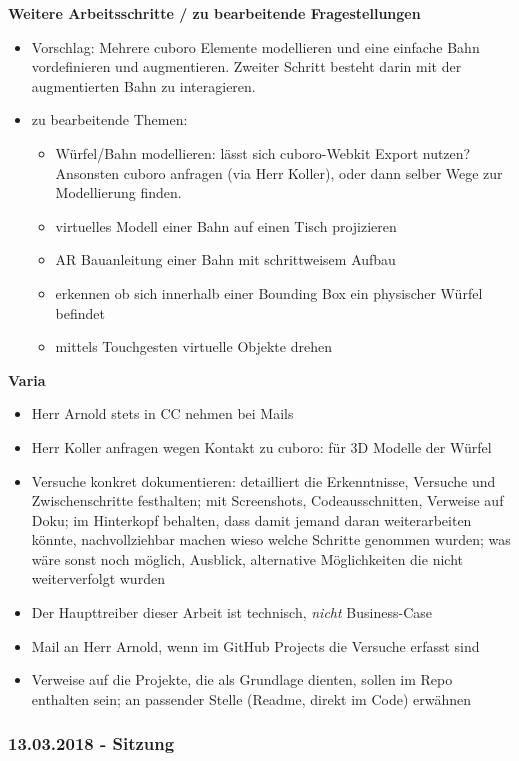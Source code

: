 \textbf{Weitere Arbeitsschritte / zu bearbeitende Fragestellungen}
\begin{itemize}
	\item Vorschlag: Mehrere cuboro Elemente modellieren und eine einfache Bahn vordefinieren und augmentieren. Zweiter Schritt besteht darin mit der augmentierten Bahn zu interagieren.
	\item zu bearbeitende Themen:
	\begin{itemize}
		\item Würfel/Bahn modellieren: lässt sich cuboro-Webkit Export nutzen? Ansonsten cuboro anfragen (via Herr Koller), oder dann selber Wege zur Modellierung finden.
		\item virtuelles Modell einer Bahn auf einen Tisch projizieren
		\item AR Bauanleitung einer Bahn mit schrittweisem Aufbau
		\item erkennen ob sich innerhalb einer Bounding Box ein physischer Würfel befindet
		\item mittels Touchgesten virtuelle Objekte drehen
	\end{itemize}
\end{itemize}

\textbf{Varia}
\begin{itemize}
	\item Herr Arnold stets in CC nehmen bei Mails
	\item Herr Koller anfragen wegen Kontakt zu cuboro: für 3D Modelle der Würfel
	\item Versuche konkret dokumentieren: detailliert die Erkenntnisse, Versuche und Zwischenschritte festhalten; mit Screenshots, Codeausschnitten, Verweise auf Doku; im Hinterkopf behalten, dass damit jemand daran weiterarbeiten könnte, nachvollziehbar machen wieso welche Schritte genommen wurden; was wäre sonst noch möglich, Ausblick, alternative Möglichkeiten die nicht weiterverfolgt wurden
	\item Der Haupttreiber dieser Arbeit ist technisch, \textit{nicht} Business-Case
	\item Mail an Herr Arnold, wenn im GitHub Projects die Versuche erfasst sind
	\item Verweise auf die Projekte, die als Grundlage dienten, sollen im Repo enthalten sein; an passender Stelle (Readme, direkt im Code) erwähnen
\end{itemize}


\subsubsection*{13.03.2018 - Sitzung}

